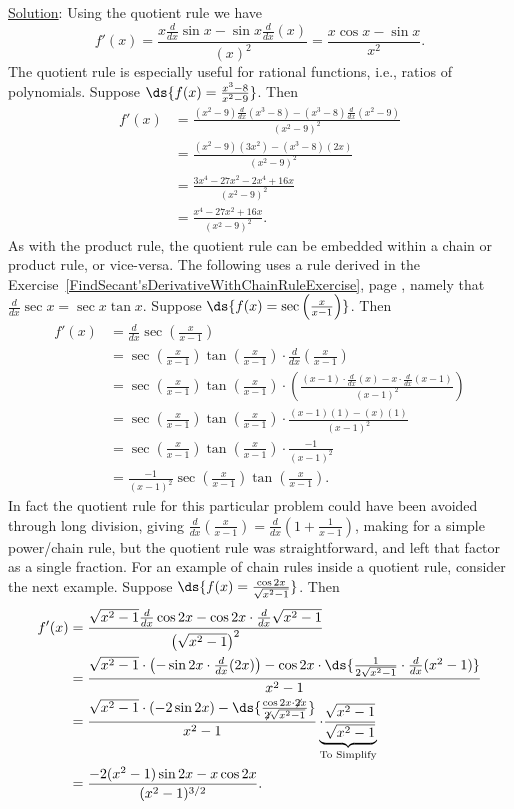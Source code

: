 \underline{Solution}: Using the quotient rule we have
$$f'(x)=\frac{x\frac{d}{dx}\sin x-\sin x\frac{d}{dx}(x)}{(x)^2}
     =\frac{x\cos x-\sin x}{x^2}.$$
\eex
The quotient rule is especially useful for rational functions,
i.e., ratios of polynomials.
\bex Suppose $\ds{f(x)=\frac{x^3-8}{x^2-9}}$.  Then
\begin{align*}f'(x)&=
   \frac{(x^2-9)\frac{d}{dx}(x^3-8)-(x^3-8)\frac{d}{dx}(x^2-9)}{(x^2-9)^2}\\
 &=\frac{(x^2-9)(3x^2)-(x^3-8)(2x)}{(x^2-9)^2}\\
 &=\frac{3x^4-27x^2-2x^4+16x}{(x^2-9)^2}\\
 &=\frac{x^4-27x^2+16x}{(x^2-9)^2}.\end{align*}
\eex
As with the product rule, the quotient rule can be 
embedded within a chain or product rule, or vice-versa.
The following uses a rule derived in the  
Exercise~\ref{FindSecant'sDerivativeWithChainRuleExercise},
page \pageref{FindSecant'sDerivativeWithChainRuleExercise},
namely that $\frac{d}{dx}\sec x=\sec x\tan x$.
\bex Suppose $\ds{f(x)=\sec\left(\frac{x}{x-1}\right)}$.
Then
\begin{align*}f'(x)&=\frac{d}{dx}\sec\left(\frac{x}{x-1}\right)\\
       &=\sec\left(\frac{x}{x-1}\right)\tan\left(\frac{x}{x-1}\right)\cdot
 \frac{d}{dx}\left(\frac{x}{x-1}\right)\\
  &=\sec\left(\frac{x}{x-1}\right)\tan\left(\frac{x}{x-1}\right)
 \cdot\left(\frac{(x-1)\cdot\frac{d}{dx}(x)-x\cdot\frac{d}{dx}(x-1)}
         {(x-1)^2}\right)\\
&=\sec\left(\frac{x}{x-1}\right)\tan\left(\frac{x}{x-1}\right)
 \cdot\frac{(x-1)(1)-(x)(1)}{(x-1)^2}\\
&=\sec\left(\frac{x}{x-1}\right)\tan\left(\frac{x}{x-1}\right)
 \cdot\frac{-1}{(x-1)^2}\\
&=\frac{-1}{(x-1)^2}
 \sec\left(\frac{x}{x-1}\right)\tan\left(\frac{x}{x-1}\right).
\end{align*}
\eex
In fact the quotient rule for this particular problem could have
been avoided through long division, giving
$\frac{d}{dx}\left(\frac{x}{x-1}\right)
=\frac{d}{dx}\left(1+\frac1{x-1}\right)$, making for
a simple power/chain rule, but the quotient rule was
straightforward, and left that factor as a single fraction.  
For an example of chain rules inside
a quotient rule, consider
the next example.
\bex Suppose $\ds{f(x)=\frac{\cos2x}{\sqrt{x^2-1}}}$.  Then
\begin{align*}
f'(x)&=\frac{\sqrt{x^2-1}\frac{d}{dx}\cos2x-\cos2x\cdot
   \frac{d}{dx}\sqrt{x^2-1}}{\left(\sqrt{x^2-1}\right)^2}\\
  &=\frac{\sqrt{x^2-1}\cdot\left(-\sin2x\cdot\frac{d}{dx}(2x)\right)
    -\cos2x\cdot\ds{\frac1{2\sqrt{x^2-1}}\cdot\frac{d}{dx}(x^2-1)}}{x^2-1}\\
&=\frac{\sqrt{x^2-1}\cdot\left(-2\sin2x\right)-\ds{\frac{\cos2x\cdot\not{2}x}
   {\not{2}\sqrt{x^2-1}}}}{x^2-1}\underbrace{\cdot\frac{\sqrt{x^2-1}}{\sqrt{x^2-1}}
   }_{\text{To Simplify}}\\
&=\frac{-2(x^2-1)\sin2x-x\cos2x}{(x^2-1)^{3/2}}.
\end{align*}
